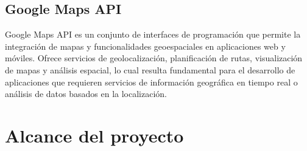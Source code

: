 \documentclass[a4paper,12pt]{report}
\begin{document}
    \section*{Google Maps API}
      Google Maps API es un conjunto de interfaces de programación que permite la integración de mapas y funcionalidades geoespaciales en aplicaciones web y móviles. Ofrece servicios de geolocalización, planificación de rutas, visualización de mapas y análisis espacial, lo cual resulta fundamental para el desarrollo de aplicaciones que requieren servicios de información geográfica en tiempo real o análisis de datos basados en la localización.
  \chapter{Alcance del proyecto}
\end{document}
